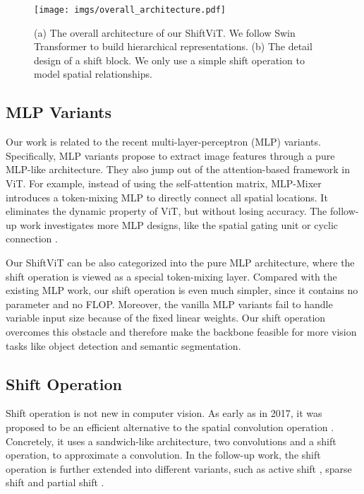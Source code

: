 \documentclass[letterpaper]{article} \usepackage{aaai22}  \usepackage{times}  \usepackage{helvet}  \usepackage{courier}  \usepackage[hyphens]{url}  \usepackage{graphicx} \usepackage{amsmath}
\begin{document}
\begin{figure*}[]
\centering
\texttt{[image: imgs/overall\_architecture.pdf]}
\caption{(a) The overall architecture of our ShiftViT. We follow Swin Transformer \cite{Swin} to build hierarchical representations. (b) The detail design of a shift block. We only use a simple shift operation to model spatial relationships.}
\label{fig:overview}
\end{figure*}

\subsection{MLP Variants}

Our work is related to the recent multi-layer-perceptron (MLP) variants. Specifically, MLP variants propose to extract image features through a pure MLP-like architecture. They also jump out of the attention-based framework in ViT. For example, instead of using the self-attention matrix, MLP-Mixer \cite{MLPMixer} introduces a token-mixing MLP to directly connect all spatial locations. It eliminates the dynamic property of ViT, but without losing accuracy. The follow-up work investigates more MLP designs, like the spatial gating unit \cite{gMLP} or cyclic connection \cite{CycleMLP}.

Our ShiftViT can be also categorized into the pure MLP architecture, where the shift operation is viewed as a special token-mixing layer. Compared with the existing MLP work, our shift operation is even much simpler, since it contains no parameter and no FLOP. Moreover, the vanilla MLP variants fail to handle variable input size because of the fixed linear weights. Our shift operation overcomes this obstacle and therefore make the backbone feasible for more vision tasks like object detection and semantic segmentation.



\subsection{Shift Operation}

Shift operation is not new in computer vision. As early as in 2017, it was proposed to be an efficient alternative to the spatial convolution operation \cite{ShiftResNet}. Concretely, it uses a sandwich-like architecture, two  convolutions and a shift operation, to approximate a  convolution. In the follow-up work, the shift operation is further extended into different variants, such as active shift \cite{ActiveShift}, sparse shift \cite{SparseShift} and partial shift \cite{TSM}.
\end{document}
